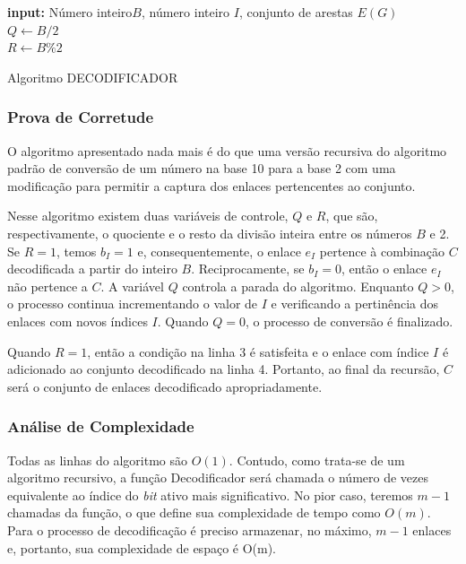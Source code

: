 \begin{algorithm}[h]
	\SetVline
	{\bf input:} Número inteiro$B$, número inteiro $I$, conjunto de arestas $E(G)$\\
	$Q \leftarrow B/2$\\
	$R \leftarrow B\%2$\\
\caption{Algoritmo DECODIFICADOR}
\label{alg:decodificador}
\end{algorithm}

\subsubsection{Prova de Corretude}

O algoritmo apresentado nada mais é do que uma versão recursiva do algoritmo padrão de conversão de um número na base 10 para a base 2 com uma modificação para permitir a captura dos enlaces pertencentes ao conjunto.

Nesse algoritmo existem duas variáveis de controle, $Q$ e $R$, que são, respectivamente, o quociente e o resto da divisão inteira entre os números $B$ e 2. Se $R=1$, temos $b_I=1$ e, consequentemente, o enlace $e_I$ pertence à combinação $C$ decodificada a partir do inteiro $B$. Reciprocamente, se $b_I=0$, então o enlace $e_I$ não pertence a $C$. A variável $Q$ controla a parada do algoritmo. Enquanto $Q>0$, o processo continua incrementando o valor de $I$ e verificando a pertinência dos enlaces com novos índices $I$. Quando $Q=0$, o processo de conversão é finalizado.

Quando $R=1$, então a condição na linha 3 é satisfeita e o enlace com índice $I$ é adicionado ao conjunto decodificado na linha 4. Portanto, ao final da recursão, $C$ será o conjunto de enlaces decodificado apropriadamente.

\subsubsection{Análise de Complexidade}

Todas as linhas do algoritmo são $O(1)$. Contudo, como trata-se de um algoritmo recursivo, a função Decodificador será chamada o número de vezes equivalente ao índice do {\it bit} ativo mais significativo. No pior caso, teremos $m-1$ chamadas da função, o que define sua complexidade de tempo como $O(m)$. Para o processo de decodificação é preciso armazenar, no máximo, $m-1$ enlaces e, portanto, sua complexidade de espaço é O(m).

